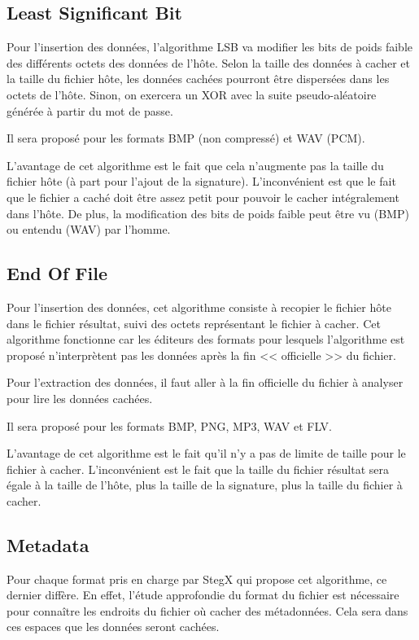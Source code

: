 \documentclass[11pt]{article}
\begin{document}
\subsection{Least Significant Bit}

Pour l'insertion des données, l'algorithme LSB va modifier les bits de 
poids faible des différents octets des données de l'hôte. Selon la taille des
données à cacher et la taille du fichier hôte, les données cachées pourront 
être dispersées dans les octets de l'hôte. Sinon, on exercera un XOR avec 
la suite pseudo-aléatoire générée à partir du mot de passe. 

Il sera proposé pour les formats BMP (non compressé) et WAV (PCM).

L'avantage de cet algorithme est le fait que cela n'augmente pas la 
taille du fichier hôte (à part pour l'ajout de la signature). 
L'inconvénient est que le fait que le fichier a caché doit être assez petit 
pour pouvoir le cacher intégralement dans l'hôte. De plus, la modification 
des bits de poids faible peut être vu (BMP) ou entendu (WAV) par l'homme. 

\subsection{End Of File}

Pour l'insertion des données, cet algorithme consiste à recopier le fichier 
hôte dans le fichier résultat, suivi des octets représentant le fichier 
à cacher. Cet algorithme fonctionne car les éditeurs 
des formats pour lesquels l'algorithme est proposé n'interprètent pas les 
données après la fin << officielle >> du fichier. 

Pour l'extraction des données, il faut aller à la fin officielle du fichier 
à analyser pour lire les données cachées. 

Il sera proposé pour les formats BMP, PNG, MP3, WAV et FLV.

L'avantage de cet algorithme est le fait qu'il n'y a pas de limite de 
taille pour le fichier à cacher. L'inconvénient est le fait que la taille 
du fichier résultat sera égale à la taille de l'hôte, plus la taille de la 
signature, plus la taille du fichier à cacher. 

\subsection{Metadata}

Pour chaque format pris en charge par StegX qui propose cet algorithme, 
ce dernier diffère. En effet, l'étude approfondie du format du fichier est 
nécessaire pour connaître les endroits du fichier où cacher des métadonnées. 
Cela sera dans ces espaces que les données seront cachées. 
\end{document}
